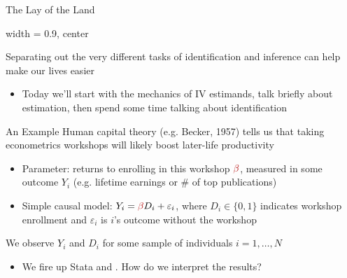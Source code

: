 \documentclass{beamer}
\begin{document}
\begin{frame}{The Lay of the Land}
  \begin{adjustbox}{width = 0.9\textwidth, center}
  \end{adjustbox}

  \vspace{10mm}
  Separating out the very different tasks of identification and inference can help make our lives easier\smallskip\pause{}
\begin{itemize}
\item Today we'll start with the mechanics of IV estimands, talk briefly about estimation, then spend some time talking about identification
\end{itemize}
\end{frame}

\begin{frame}{An Example}
Human capital theory (e.g. Becker, 1957) tells us that taking econometrics workshops will likely boost later-life productivity\pause
\begin{itemize}
  \item Parameter: returns to enrolling in this workshop $\violetRed{\beta}$, measured in some outcome $Y_i$ (e.g. lifetime earnings or \# of top publications)
  \item Simple causal model: $Y_i= \violetRed{\beta} D_i + \varepsilon_i$, where $D_i \in \{0,1\}$ indicates workshop enrollment and $\varepsilon_i$ is $i$'s outcome without the workshop
\end{itemize}\pause\medskip

We observe $Y_i$ and $D_i$ for some sample of individuals $i=1,\dots,N$
\begin{itemize}
  \item We fire up Stata and . \pause{} How do we interpret the results?
\end{itemize}

\end{frame}
\end{document}
